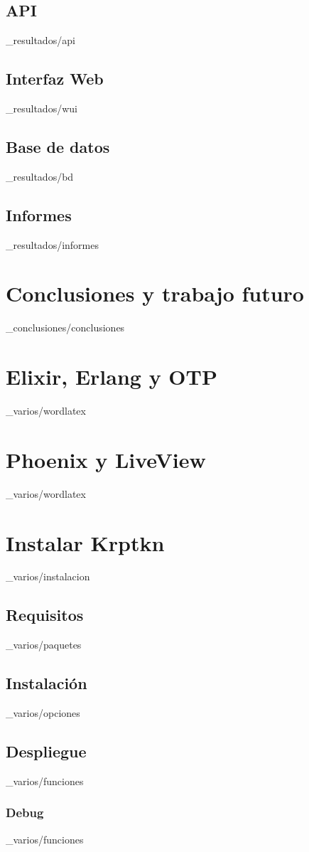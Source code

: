 \documentclass[epsbased,copyright,final,printable,covers,extendedindex,firstnumbered,tfg,gnuplot]{tfgtfmthesisuam}
\begin{document}
  \section{API\label{SEC:API}}{_resultados/api}
  \section{Interfaz Web\label{SEC:WUI}}{_resultados/wui}
  \section{Base de datos\label{SEC:BD}}{_resultados/bd}
  \section{Informes\label{SEC:INFORMES}}{_resultados/informes}

\chapter{Conclusiones y trabajo futuro\label{CAP:CONCLUSIONES}}{_conclusiones/conclusiones}

\appendix

\chapter{Elixir, Erlang y OTP\label{CAP:INSTALACION}}{_varios/wordlatex}
\chapter{Phoenix y LiveView\label{CAP:INSTALACION}}{_varios/wordlatex}
\chapter{Instalar Krptkn\label{CAP:INSTALACION}}{_varios/instalacion}
  \section{Requisitos\label{SEC:NUCLEO}}{_varios/paquetes}
  \section{Instalación\label{SEC:API}}{_varios/opciones}
  \section{Despliegue\label{SEC:API}}{_varios/funciones}
    \subsection{Debug\label{SS:LIBEXTRACTOR}}{_varios/funciones}
\end{document}

